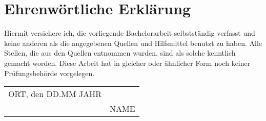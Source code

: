 %

\chapter*{Ehrenwörtliche Erklärung}
\thispagestyle{empty}			      %

Hiermit versichere ich, die vorliegende Bachelorarbeit selbstständig 
verfasst und keine anderen als die angegebenen Quellen und Hilfsmittel
benutzt zu haben.
Alle Stellen, die aus den Quellen entnommen wurden, sind als solche 
kenntlich gemacht worden. Diese Arbeit hat in gleicher oder ähnlicher 
Form noch keiner Prüfungsbehörde vorgelegen.

\vspace{3cm}

\begin{tabular}{lc}
\noindent ORT, den DD.MM JAHR \hspace*{2cm} & \underline{\hspace{6cm}}\\
& NAME
\end{tabular}

